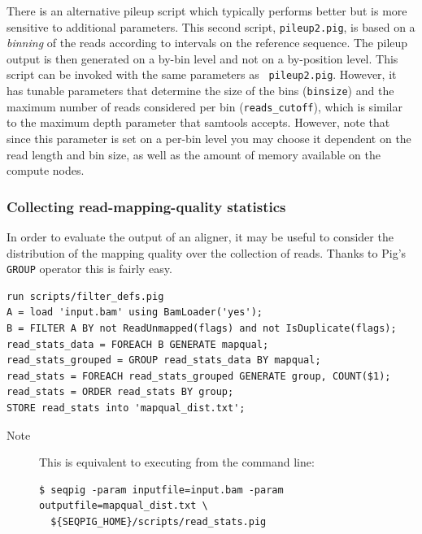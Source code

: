 There is an alternative pileup script which typically performs better
but is more sensitive to additional parameters. This second script,
{\tt pileup2.pig}, is based on a \emph{binning} of the reads according
to intervals on the reference sequence. The pileup output is then
generated on a by-bin level and not on a by-position level. This
script can be invoked with the same parameters as {\tt
  pileup2.pig}. However, it has tunable parameters that determine the
size of the bins ({\tt binsize}) and the maximum number of reads
considered per bin ({\tt reads\_cutoff}), which is similar to the
maximum depth parameter that samtools accepts. However, note that
since this parameter is set on a per-bin level you may choose it
dependent on the read length and bin size, as well as the amount of
memory available on the compute nodes.

\subsubsection{Collecting read-mapping-quality statistics}
In order to evaluate the output of an aligner, it may be useful to
consider the distribution of the mapping quality over the collection of
reads. Thanks to Pig's {\tt GROUP} operator this is fairly easy.
\begin{lstlisting}
run scripts/filter_defs.pig
A = load 'input.bam' using BamLoader('yes');
B = FILTER A BY not ReadUnmapped(flags) and not IsDuplicate(flags);
read_stats_data = FOREACH B GENERATE mapqual;
read_stats_grouped = GROUP read_stats_data BY mapqual;
read_stats = FOREACH read_stats_grouped GENERATE group, COUNT($1);
read_stats = ORDER read_stats BY group;
STORE read_stats into 'mapqual_dist.txt';
\end{lstlisting}
\begin{description}
	\item[Note] This is equivalent to executing from the command line:
\begin{lstlisting}
$ seqpig -param inputfile=input.bam -param outputfile=mapqual_dist.txt \ 
  ${SEQPIG_HOME}/scripts/read_stats.pig
\end{lstlisting}
\end{description}

